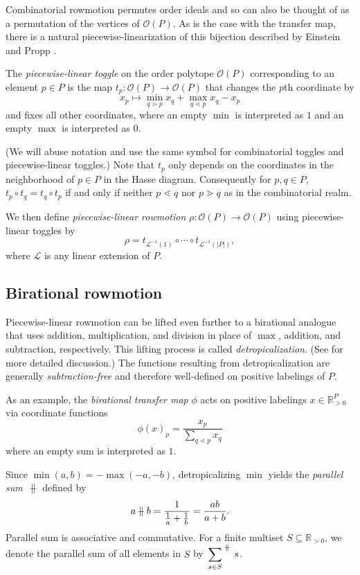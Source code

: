 \documentclass[ALCO,Unicode,published]{cedram}
\numberwithin{equation}{section}
\newcommand{\op}{\mathcal{O}(P)}
\newcommand{\parallelsum}{\:\ \mathclap{\|}\mathclap{-}\ \:}
\begin{document}
Combinatorial rowmotion permutes order ideals and so can also be thought of as a permutation of the vertices of $\op$. As is the case with the transfer map, there is a natural piecewise-linearization of this bijection described by Einstein and Propp \cite{einsteinpropp1}.

\begin{Def}
The \textit{piecewise-linear toggle} on the order polytope $\op$ corresponding to an element $p \in P$ is the map $t_p\colon \op \to \op$ that changes the $p$th coordinate by
\[x_p \mapsto \min\limits_{q \gtrdot p} x_q + \max\limits_{q \lessdot p} x_q - x_p\]
and fixes all other coordinates, where an empty $\min$ is interpreted as $1$ and an empty $\max$ is interpreted as $0$.
\end{Def}
(We will abuse notation and use the same symbol for combinatorial toggles and piecewise-linear toggles.)
Note that $t_p$ only depends on the coordinates in the neighborhood of $p \in P$ in the Hasse diagram. Consequently for $p,q \in P$, $t_p \circ t_q = t_q \circ t_p$ if and only if neither $p \lessdot q$ nor $p \gtrdot q$ as in the combinatorial realm.

We then define \textit{piecewise-linear rowmotion} $\rho\colon \op \to \op$ using piecewise-linear toggles by
\[\rho = t_{\mathcal{L}^{-1}(1)} \circ \cdots \circ t_{\mathcal{L}^{-1}(|P|)},\]
where $\mathcal{L}$ is any linear extension of $P$.

\subsection{Birational rowmotion}

Piecewise-linear rowmotion can be lifted even further to a birational analogue that uses addition, multiplication, and division in place of $\max$, addition, and subtraction, respectively. This lifting process is called \emph{detropicalization}. (See \cite{einsteinpropp2,einsteinpropp1,noumiyamada} for more detailed discussion.) The functions resulting from detropicalization are generally \emph{subtraction-free} and therefore well-defined on positive labelings of $P$.

As an example, the \emph{birational transfer map} $\phi$ acts on positive labelings $x \in \mathbb R^P_{>0}$ via coordinate functions
\[\phi(x)_p = \frac{x_p}{\sum\limits_{q \lessdot p} x_q}\]
where an empty sum is interpreted as $1$.

Since $\min(a,b) = -\max(-a,-b)$, detropicalizing $\min$ yields the \textit{parallel sum}~$\parallelsum$ defined by
\[a \parallelsum b = \frac{1}{\frac{1}{a} + \frac{1}{b}} = \frac{ab}{a+b}.\]
Parallel sum is associative and commutative. For a finite multiset $S \subseteq \mathbb{R}_{>0}$, we denote the parallel sum of all elements in $S$ by $\sideset{}{^{\parallelsum}} \sum\limits_{s \in S} s$.
\end{document}

